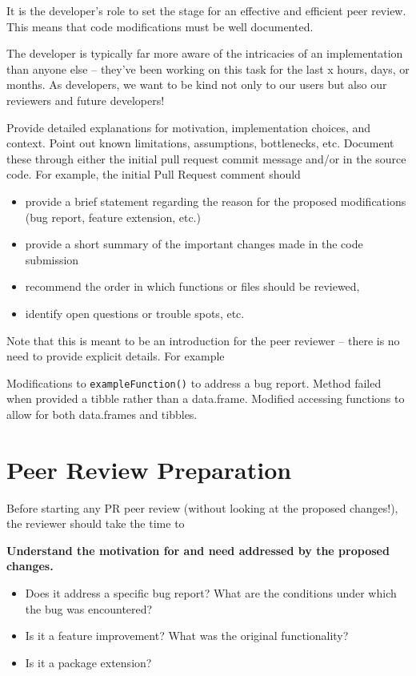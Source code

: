 \documentclass[
]{book}
\providecommand{\tightlist}{%
  \setlength{\itemsep}{0pt}\setlength{\parskip}{0pt}}
\begin{document}
It is the developer's role to set the stage for an effective and efficient peer review. This means that code modifications must be well documented.

The developer is typically far more aware of the intricacies of an implementation than anyone else -- they've been working on this task for the last x hours, days, or months. As developers, we want to be kind not only to our users but also our reviewers and future developers!

Provide detailed explanations for motivation, implementation choices, and context. Point out known limitations, assumptions, bottlenecks, etc. Document these through either the initial pull request commit message and/or in the source code. For example, the initial Pull Request comment should

\begin{itemize}
\tightlist
\item
  provide a brief statement regarding the reason for the proposed modifications (bug report, feature extension, etc.)
\item
  provide a short summary of the important changes made in the code submission
\item
  recommend the order in which functions or files should be reviewed,
\item
  identify open questions or trouble spots, etc.
\end{itemize}

Note that this is meant to be an introduction for the peer reviewer -- there is no need to provide explicit details. For example

Modifications to \texttt{exampleFunction()} to address a bug report. Method failed when provided a tibble rather than a data.frame. Modified accessing functions to allow for both data.frames and tibbles.

\hypertarget{peer-review-preparation}{%
\section{Peer Review Preparation}\label{peer-review-preparation}}

Before starting any PR peer review (without looking at the proposed changes!), the reviewer should take the time to

\textbf{Understand the motivation for and need addressed by the proposed changes.}

\begin{itemize}
\tightlist
\item
  Does it address a specific bug report? What are the conditions under which the bug was encountered?
\item
  Is it a feature improvement? What was the original functionality?
\item
  Is it a package extension?
\end{itemize}
\end{document}
